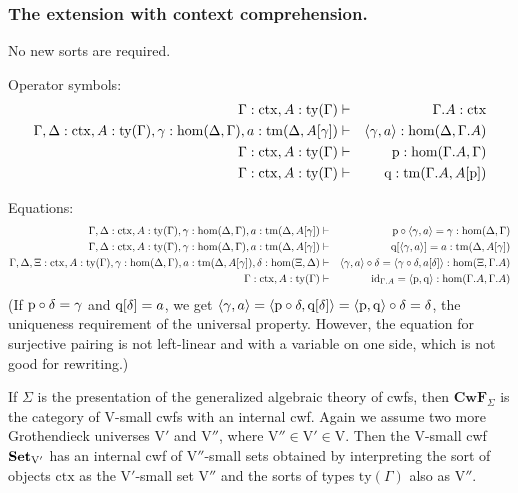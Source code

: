 \documentclass{mscs}
\def\V{\mathrm{V}}
\def\Cwf{\mathbf{CwF}}
\def\Hom{\mathrm{hom}}
\def\id{\mathrm{id}}
\newcommand{\ctx}{\mathrm{ctx}}
\newcommand{\ty}{\mathrm{ty}}
\newcommand{\tm}{\mathrm{tm}}
\begin{document}
\subsubsection{The extension with context comprehension.}

No new sorts are required.

Operator symbols:
\begin{eqnarray*}
\Gamma : \ctx, A:\ty(\Gamma) &\vdash& \Gamma\cext A : \ctx\\
\Gamma,\Delta : \ctx, A:\ty(\Gamma), \gamma : \Hom(\Delta,\Gamma), a:\tm(\Delta,A[\gamma]) &\vdash& \tuple{\gamma,a} : \Hom(\Delta,\Gamma\cext A)\\
\Gamma : \ctx, A:\ty(\Gamma) &\vdash& \p: \Hom(\Gamma\cext A,\Gamma)\\
\Gamma : \ctx, A:\ty(\Gamma) &\vdash& \q: \tm(\Gamma\cext A,A[\p])
\end{eqnarray*}

Equations:
\begin{eqnarray*}
\Gamma,\Delta : \ctx, A:\ty(\Gamma), \gamma : \Hom(\Delta,\Gamma), a:\tm(\Delta,A[\gamma]) &\vdash& \p\circ\tuple{\gamma,a} = \gamma : \Hom(\Delta,\Gamma)\\
\Gamma,\Delta : \ctx, A:\ty(\Gamma), \gamma : \Hom(\Delta,\Gamma), a:\tm(\Delta,A[\gamma]) &\vdash& \q[\tuple{\gamma,a}] = a : \tm(\Delta,A[\gamma]) \\
\Gamma,\Delta,\Xi : \ctx, A:\ty(\Gamma), \gamma : \Hom(\Delta,\Gamma), a:\tm(\Delta,A[\gamma]), \delta : \Hom(\Xi,\Delta) &\vdash&
\tuple{\gamma,a} \circ \delta = \tuple{\gamma\circ\delta,a[\delta]} :
\Hom(\Xi,\Gamma\cext A) \\
\Gamma : \ctx, A:\ty(\Gamma) &\vdash&
\id_{\Gamma\cext A} = \tuple{\p,\q} : \Hom(\Gamma\cext A,\Gamma\cext A)
\end{eqnarray*}
(If $\mathrm{p}\circ\delta = \gamma$ and $\mathrm{q}[\delta]=a$, we get
$\langle \gamma,a \rangle=\langle \mathrm{p}\circ\delta, \mathrm{q}[\delta] \rangle = \langle \mathrm{p},\mathrm{q} \rangle\circ\delta =
\delta$, the uniqueness requirement of the universal property.
However, the equation for surjective pairing is not left-linear and with
a variable on one side, which is not good for rewriting.)

If $\Sigma$ is the presentation of the generalized algebraic theory of cwfs, then $\Cwf_\Sigma$ is the category of $\V$-small cwfs with an internal cwf. Again we assume two more Grothendieck universes $\V'$ and $\V''$, where $\V''  \in \V' \in \V$.
Then the $\V$-small cwf $\Set_{\V'}$ has an internal cwf of $\V''$-small sets obtained by interpreting the sort of objects $\ctx$ as the $\V'$-small set $\V''$ and the sorts of types $\ty(\Gamma)$ also as $\V''$.
\end{document}
